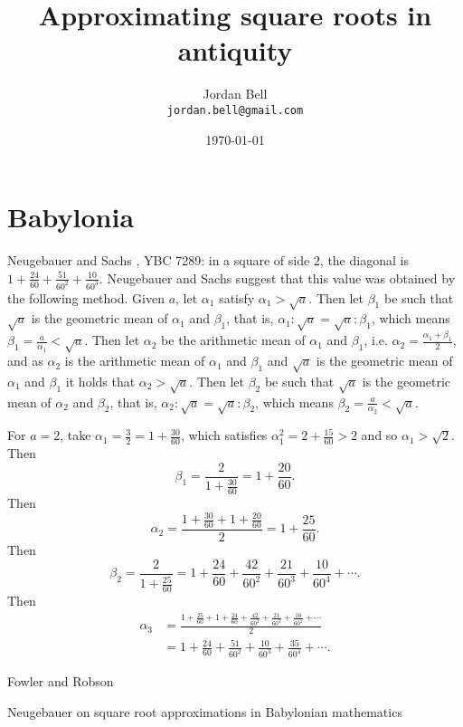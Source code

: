 \documentclass{article}
\theoremstyle{definition}
\begin{document}
\title{Approximating square roots in  antiquity}
\author{Jordan Bell\\ \texttt{jordan.bell@gmail.com}}
\date{\today}

\maketitle

\tableofcontents


\section{Babylonia}
Neugebauer and Sachs \cite[pp.~42--43]{cuneiform}, YBC 7289: in a square of side $2$, 
the diagonal is  $1+\frac{24}{60}+\frac{51}{60^2}+\frac{10}{60^3}$.  
Neugebauer and Sachs suggest that this value was obtained by the following method.
Given $a$, let $\alpha_1$ satisfy  $\alpha_1>\sqrt{a}$. 
Then let $\beta_1$ be such that 
$\sqrt{a}$ is the geometric mean of $\alpha_1$ and $\beta_1$, that is, $\alpha_1:\sqrt{a} = \sqrt{a}:\beta_1$, which
means
$\beta_1 = \frac{a}{\alpha_1}<\sqrt{a}$. 
Then let
$\alpha_2$ be the arithmetic mean of $\alpha_1$ and $\beta_1$,
i.e. $\alpha_2 = \frac{\alpha_1+\beta_1}{2}$,
and as $\alpha_2$ is the arithmetic mean of $\alpha_1$ and $\beta_1$
and $\sqrt{a}$ is the geometric mean of $\alpha_1$ and $\beta_1$ it holds that $\alpha_2>\sqrt{a}$. 
Then let $\beta_2$ be such that $\sqrt{a}$ is the geometric mean of $\alpha_2$ and $\beta_2$, that is,
$\alpha_2:\sqrt{a}=\sqrt{a}:\beta_2$, which means $\beta_2=\frac{a}{\alpha_2}<\sqrt{a}$. 

For $a=2$, take $\alpha_1=\frac{3}{2}=1+\frac{30}{60}$, which satisfies $\alpha_1^2=2+\frac{15}{60}>2$ and so $\alpha_1>\sqrt{2}$.
Then
\[
\beta_1  =\frac{2}{1+\frac{30}{60}}=1+\frac{20}{60}.
\]
Then
\[
\alpha_2 = \frac{1+\frac{30}{60}+1+\frac{20}{60}}{2} = 1 + \frac{25}{60}.
\]
Then 
\[
\beta_2 = \frac{2}{1 + \frac{25}{60}} = 1+\frac{24}{60}+\frac{42}{60^2}+\frac{21}{60^3}
+\frac{10}{60^4}+\cdots.
\]
Then
\begin{align*}
\alpha_3 &= \frac{1 + \frac{25}{60} + 1+\frac{24}{60}+\frac{42}{60^2}+\frac{21}{60^3}
+\frac{10}{60^4}+\cdots}{2}\\
&=1+\frac{24}{60}+\frac{51}{60^2}+\frac{10}{60^3}+\frac{35}{60^4}+\cdots.
\end{align*}

Fowler and Robson \cite{YBC7289}

Neugebauer \cite{neugebauer1931} on square root approximations in Babylonian mathematics
\end{document}
